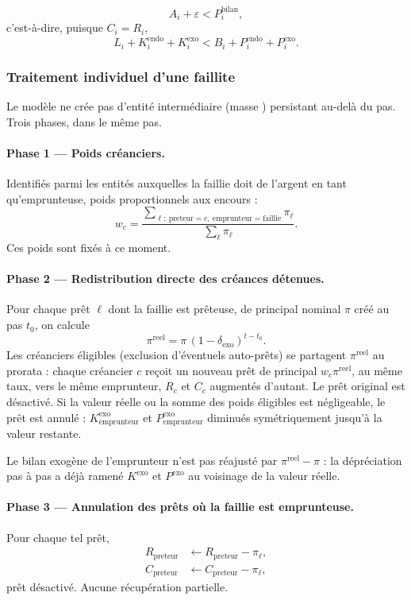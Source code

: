 \documentclass[10pt,a4paper]{article}
\begin{document}
\[
A_i + \varepsilon < P_i^{\mathrm{bilan}},
\]
c'est-à-dire, puisque \(C_i=R_i\),
\[
L_i + K_i^{\mathrm{endo}} + K_i^{\mathrm{exo}}
<
B_i + P_i^{\mathrm{endo}} + P_i^{\mathrm{exo}}.
\]

\subsubsection{Traitement individuel d'une faillite}

Le modèle ne crée pas d'entité intermédiaire (\og masse \fg{}) persistant au-delà du pas. Trois phases, dans le même pas.

\paragraph{Phase 1 — Poids créanciers.} Identifiés parmi les entités auxquelles la faillie doit de l'argent en tant qu'emprunteuse, poids proportionnels aux encours :
\[
w_c = \frac{
\sum_{\ell:\ \mathrm{preteur}=c,\ \mathrm{emprunteur}=\mathrm{faillie}}\pi_\ell
}{
\sum_\ell \pi_\ell
}.
\]
Ces poids sont fixés à ce moment.

\paragraph{Phase 2 — Redistribution directe des créances détenues.} Pour chaque prêt \(\ell\) dont la faillie est prêteuse, de principal nominal \(\pi\) créé au pas \(t_0\), on calcule
\[
\pi^{\mathrm{reel}} = \pi\,(1-\delta_{\mathrm{exo}})^{t-t_0}.
\]
Les créanciers éligibles (exclusion d'éventuels auto-prêts) se partagent \(\pi^{\mathrm{reel}}\) au prorata : chaque créancier \(c\) reçoit un nouveau prêt de principal \(w_c\pi^{\mathrm{reel}}\), au même taux, vers le même emprunteur, \(R_c\) et \(C_c\) augmentés d'autant. Le prêt original est désactivé. Si la valeur réelle ou la somme des poids éligibles est négligeable, le prêt est annulé : \(K_{\mathrm{emprunteur}}^{\mathrm{exo}}\) et \(P_{\mathrm{emprunteur}}^{\mathrm{exo}}\) diminués symétriquement jusqu'à la valeur restante.

Le bilan exogène de l'emprunteur n'est pas réajusté par \(\pi^{\mathrm{reel}}-\pi\) : la dépréciation pas à pas a déjà ramené \(K^{\mathrm{exo}}\) et \(P^{\mathrm{exo}}\) au voisinage de la valeur réelle.

\paragraph{Phase 3 — Annulation des prêts où la faillie est emprunteuse.} Pour chaque tel prêt,
\begin{align*}
R_{\mathrm{preteur}} &\leftarrow R_{\mathrm{preteur}}-\pi_\ell,\\
C_{\mathrm{preteur}} &\leftarrow C_{\mathrm{preteur}}-\pi_\ell,
\end{align*}
prêt désactivé. Aucune récupération partielle.
\end{document}
